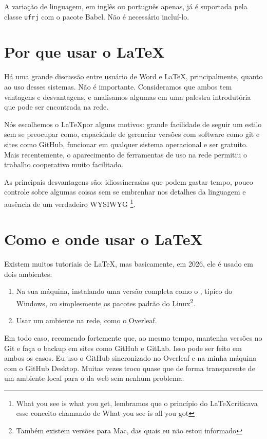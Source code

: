\documentclass[dsc,pdfa,setavermelha]{ufrj}
\theoremstyle{plain}
\theoremstyle{definition}
\theoremstyle{remark}
\begin{document}
  A variação de linguagem, em inglês ou português apenas, já é suportada pela classe \verb|ufrj| com o pacote Babel. Não é necessário incluí-lo.

\section{Por que usar o \LaTeX}

  Há uma grande discussão entre usuário de Word e \LaTeX, principalmente, quanto ao uso desses sistemas. Não é importante. Consideramos que ambos tem vantagens e desvantagens, e analisamos algumas em uma palestra introdutória que pode ser encontrada na rede.

  Nós escolhemos o \LaTeX por alguns motivos: grande facilidade de seguir um estilo sem se preocupar como, capacidade de gerenciar versões com software como git e sites como GitHub, funcionar em qualquer sistema operacional e  ser gratuito. Mais recentemente, o aparecimento de ferramentas de uso na rede permitiu o trabalho cooperativo muito facilitado.

  As principais desvantagens são: idiossincrasias que podem gastar tempo, pouco controle sobre algumas coisas sem se embrenhar nos detalhes da linguagem e ausência de um verdadeiro WYSIWYG \footnote{What you see is what you get, lembramos que o princípio do \LaTeX criticava esse conceito chamando de What you see is all you got}.

\section{Como e onde usar o \LaTeX}

  Existem muitos tutoriais de \LaTeX, mas basicamente, em 2026, ele é usado em dois ambientes:
  \begin{enumerate}
  \item Na sua máquina, instalando uma versão completa como o , típico do Windows, ou simplesmente os pacotes padrão do Linux\footnote{Também existem versões para Mac, das quais eu não estou informado}.
  \item Usar um ambiente na rede, como o Overleaf.
  \end{enumerate}

  Em todo caso, recomendo fortemente que, ao mesmo tempo, mantenha versões no Git e faça o backup em sites como GitHub e GitLab. Isso pode ser feito em ambos os casos. Eu uso o GitHub sincronizado no Overleaf e na minha máquina com o GitHub Desktop. Muitas vezes troco quase que de forma transparente de um ambiente local para o da web sem nenhum problema.
\end{document}
